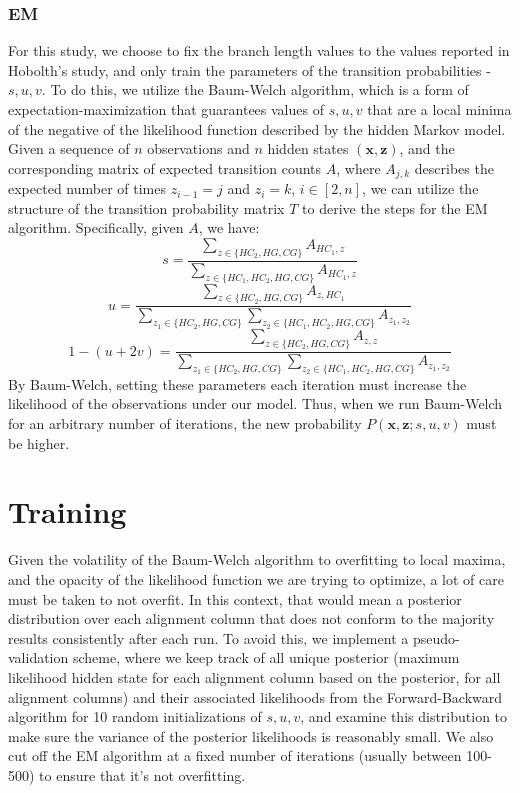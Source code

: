 \documentclass[12pt]{article}
\begin{document}
    \subsubsection{EM}
    For this study, we choose to fix the branch length values to the values reported in Hobolth's study, and only train the parameters of the transition probabilities - $s, u, v$. To do this, we utilize the Baum-Welch algorithm, which is a form of expectation-maximization that guarantees values of $s, u, v$ that are a local minima of the negative of the likelihood function described by the hidden Markov model. Given a sequence of $n$ observations and $n$ hidden states $(\textbf{x}, \textbf{z})$, and the corresponding matrix of expected transition counts $A$, where $A_{j,k}$ describes the expected number of times $z_{i-1} = j$ and $z_{i} = k$, $i \in [2,n]$, we can utilize the structure of the transition probability matrix $T$ to derive the steps for the EM algorithm. Specifically, given $A$, we have:
    $$s = \frac{\sum_{z \in \{HC_2, HG, CG\}} A_{HC_1, z}}{\sum_{z \in \{HC_1, HC_2, HG, CG\}} A_{HC_1, z}}$$
    $$u = \frac{\sum_{z \in \{HC_2, HG, CG\}} A_{z, HC_1}}{\sum_{z_1 \in \{HC_2, HG, CG\}} \sum_{z_2 \in \{HC_1, HC_2, HG, CG\}} A_{z_1, z_2}}$$
    $$1 - (u + 2v) = \frac{\sum_{z \in \{HC_2, HG, CG\}} A_{z, z}}{\sum_{z_1 \in \{HC_2, HG, CG\}} \sum_{z_2 \in \{HC_1, HC_2, HG, CG\}} A_{z_1, z_2}}$$
    By Baum-Welch, setting these parameters each iteration must increase the likelihood of the observations under our model. Thus, when we run Baum-Welch for an arbitrary number of iterations, the new probability $P(\textbf{x}, \textbf{z}; s, u, v)$ must be higher.
    \section{Training}
    Given the volatility of the Baum-Welch algorithm to overfitting to local maxima, and the opacity of the likelihood function we are trying to optimize, a lot of care must be taken to not overfit. In this context, that would mean a posterior distribution over each alignment column that does not conform to the majority results consistently after each run. To avoid this, we implement a pseudo-validation scheme, where we keep track of all unique posterior (maximum likelihood hidden state for each alignment column based on the posterior, for all alignment columns) and their associated likelihoods from the Forward-Backward algorithm for 10 random initializations of $s, u, v$, and examine this distribution to make sure the variance of the posterior likelihoods is reasonably small. We also cut off the EM algorithm at a fixed number of iterations (usually between 100-500) to ensure that it's not overfitting.
\end{document}
